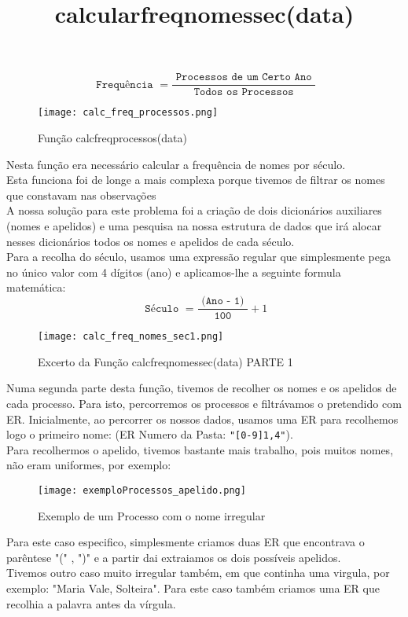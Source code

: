 \documentclass[11pt,a4paper]{report}%
\begin{document}
$$
\texttt { Frequência }=\frac{\texttt { Processos de um Certo Ano }}{\texttt { Todos os Processos }}
$$





\begin{figure}[htbp]
\centerline{\texttt{[image: calc\_freq\_processos.png]}}
\caption{Função calc\textunderscore freq\textunderscore processos(data)}
\label{fig}
\end{figure}  

\newpage
\title{\textbf{calcular\textunderscore freq\textunderscore nomes\textunderscore sec(data)}}

Nesta função era necessário calcular a frequência de nomes por século.\\
Esta funciona foi de longe a mais complexa porque tivemos de filtrar os nomes que constavam nas observações\\
A nossa solução para este problema foi a criação de dois dicionários auxiliares (nomes e apelidos) e uma pesquisa na nossa estrutura de dados que irá alocar nesses dicionários todos os nomes e apelidos de cada século.\\
Para a recolha do século, usamos uma expressão regular que simplesmente pega no único valor com 4 dígitos (ano) e aplicamos-lhe a seguinte formula matemática:
$$
\texttt { Século }=\frac{\texttt { (Ano - 1) }}{\texttt { 100 }} + 1
$$
\begin{figure}[htbp]
\centerline{\texttt{[image: calc\_freq\_nomes\_sec1.png]}}
\caption{Excerto da Função calc\textunderscore freq\textunderscore nomes\textunderscore sec(data) PARTE 1}
\label{fig}
\end{figure} 

Numa segunda parte desta função, tivemos de recolher os nomes e os apelidos de cada processo.
Para isto, percorremos os processos e filtrávamos o pretendido com ER.
Inicialmente, ao percorrer os nossos dados, usamos uma ER para recolhemos logo o primeiro nome: (ER Numero da Pasta: \texttt{"[0-9]{1,4}"}).\\
Para recolhermos o apelido, tivemos bastante mais trabalho, pois muitos nomes, não eram uniformes, por exemplo:

 \begin{figure}[htbp]
\centerline{\texttt{[image: exemploProcessos\_apelido.png]}}
\caption{Exemplo de um Processo com o nome irregular}
\label{fig}
\end{figure}

Para este caso especifico, simplesmente criamos duas ER que encontrava o parêntese "(" , ")" e a partir dai extraiamos os dois possíveis apelidos.\\
Tivemos outro caso muito irregular também, em que continha uma virgula, por exemplo: "Maria Vale, Solteira". Para este caso também criamos uma ER que recolhia a palavra antes da vírgula.\\
\end{document}
